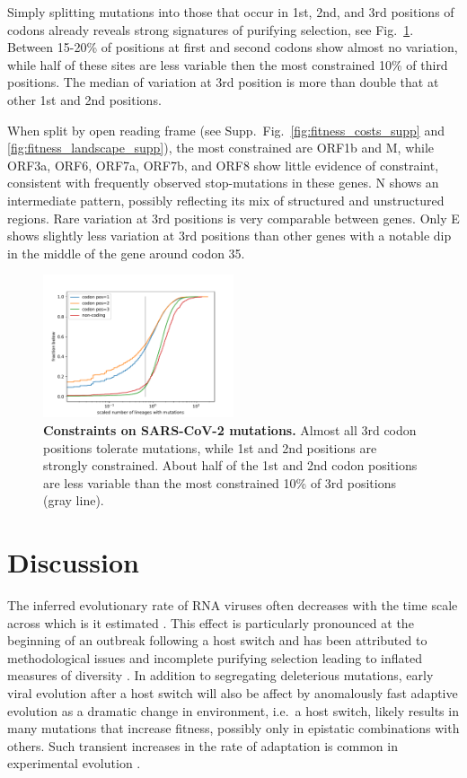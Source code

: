 \documentclass[aps,rmp, twocolumn]{revtex4}
\begin{document}
Simply splitting mutations into those that occur in 1st, 2nd, and 3rd positions of codons already reveals strong signatures of purifying selection, see Fig.~\ref{fig:fitness_costs}.
Between 15-20\% of positions at first and second codons show almost no variation, while half of these sites are less variable then the most constrained 10\% of third positions.
The median of variation at 3rd position is more than double that at other 1st and 2nd positions.

When split by open reading frame (see Supp.~Fig.~\ref{fig:fitness_costs_supp} and \ref{fig:fitness_landscape_supp}), the most constrained are ORF1b and M, while ORF3a, ORF6, ORF7a, ORF7b, and ORF8 show little evidence of constraint, consistent with frequently observed stop-mutations in these genes.
N shows an intermediate pattern, possibly reflecting its mix of structured and unstructured regions.
Rare variation at 3rd positions is very comparable between genes.
Only E shows slightly less variation at 3rd positions than other genes with a notable dip in the middle of the gene around codon 35.



\begin{figure}
    \includegraphics[width=0.5\textwidth]{figures/fitness_cost.pdf}
    \caption{{\bf Constraints on SARS-CoV-2 mutations.}
    Almost all 3rd codon positions tolerate mutations, while 1st and 2nd positions are strongly constrained.
    About half of the 1st and 2nd codon positions are less variable than the most constrained 10\% of 3rd positions (gray line).
    \label{fig:fitness_costs}}
 \end{figure}


\section*{Discussion}
The inferred evolutionary rate of RNA viruses often decreases with the time scale across which is it estimated \citep{wertheim_purifying_2011,ghafari_prisoner_2021}.
This effect is particularly pronounced at the beginning of an outbreak following a host switch and has been attributed to methodological issues and incomplete purifying selection leading to inflated measures of diversity \citep{meyer_time_2015,ghafari_purifying_2022}.
In addition to segregating deleterious mutations, early viral evolution after a host switch will also be affect by anomalously fast adaptive evolution as a dramatic change in environment, i.e.~a host switch, likely results in many mutations that increase fitness, possibly only in epistatic combinations with others.
Such transient increases in the rate of adaptation is common in experimental evolution \citep{elena_virus_2007}.
\end{document}
